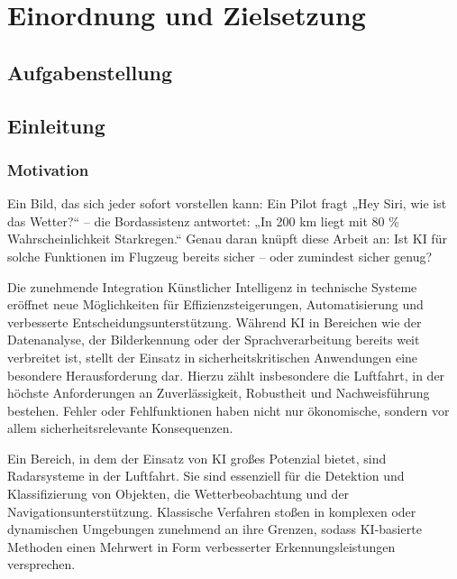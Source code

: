 
\part{Einordnung und Zielsetzung}

\chapter{Aufgabenstellung}


\chapter{Einleitung}

\section{Motivation}
Ein Bild, das sich jeder sofort vorstellen kann: Ein Pilot fragt „Hey Siri, wie ist das Wetter?“ 
– die Bordassistenz antwortet: „In 200 km liegt mit 80 \% Wahrscheinlichkeit Starkregen.“ 
Genau daran knüpft diese Arbeit an: Ist KI für solche Funktionen im Flugzeug bereits sicher 
– oder zumindest sicher genug? 

Die zunehmende Integration Künstlicher Intelligenz in technische Systeme eröffnet 
neue Möglichkeiten für Effizienzsteigerungen, Automatisierung und verbesserte 
Entscheidungsunterstützung. Während KI in Bereichen wie der Datenanalyse, der 
Bilderkennung oder der Sprachverarbeitung bereits weit verbreitet ist, stellt 
der Einsatz in sicherheitskritischen Anwendungen eine besondere Herausforderung dar. 
Hierzu zählt insbesondere die Luftfahrt, in der höchste Anforderungen an Zuverlässigkeit, 
Robustheit und Nachweisführung bestehen. Fehler oder Fehlfunktionen haben nicht nur 
ökonomische, sondern vor allem sicherheitsrelevante Konsequenzen.

Ein Bereich, in dem der Einsatz von KI großes Potenzial bietet, sind Radarsysteme 
in der Luftfahrt. Sie sind essenziell für die Detektion und Klassifizierung von 
Objekten, die Wetterbeobachtung und der Navigationsunterstützung. Klassische 
Verfahren stoßen in komplexen oder dynamischen Umgebungen zunehmend an ihre Grenzen, 
sodass KI-basierte Methoden einen Mehrwert in Form verbesserter Erkennungsleistungen 
versprechen.

